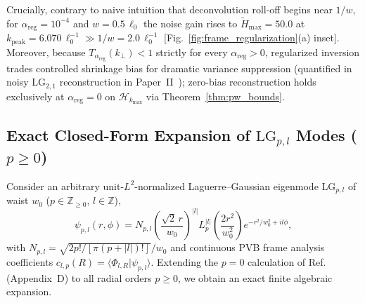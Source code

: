 \documentclass[aps,pra,onecolumn,notitlepage,11pt,tightenlines,nofootinbib,floatfix,longbibliography]{revtex4-2}
\theoremstyle{remark}
\newcommand{\braket}[2]{\langle #1 | #2 \rangle}
\newcommand{\abs}[1]{\lvert #1 \rvert}
\begin{document}
Crucially, contrary to naive intuition that deconvolution roll-off begins near $1/w$, for $\alpha_{\mathrm{reg}} = 10^{-4}$ and $w = 0.5\,\ell_0$ the noise gain rises to $\widetilde{H}_{\max} = 50.0$ at $k_{\mathrm{peak}} = 6.070\,\ell_0^{-1} \gg 1/w = 2.0\,\ell_0^{-1}$ [Fig.~\ref{fig:frame_regularization}(a) inset]. Moreover, because $T_{\alpha_{\mathrm{reg}}}(k_\perp) < 1$ strictly for every $\alpha_{\mathrm{reg}} > 0$, regularized inversion trades controlled shrinkage bias for dramatic variance suppression (quantified in noisy $\mathrm{LG}_{2,1}$ reconstruction in Paper~II~\cite{AyalaPaperII}); zero-bias reconstruction holds exclusively at $\alpha_{\mathrm{reg}} = 0$ on $\mathcal{H}_{k_{\max}}$ via Theorem~\ref{thm:pw_bounds}.

\subsection{Exact Closed-Form Expansion of \texorpdfstring{$\mathrm{LG}_{p,l}$}{LG\_\{p,l\}} Modes (\texorpdfstring{$p \ge 0$}{p >= 0})}
\label{subsec:lg_expansion}

Consider an arbitrary unit-$L^2$-normalized Laguerre--Gaussian eigenmode $\mathrm{LG}_{p,l}$ of waist $w_0$ ($p \in \mathbb{Z}_{\ge 0}$, $l \in \mathbb{Z}$),
\begin{equation}
\psi_{p,l}(r,\phi) = N_{p,l}\left(\frac{\sqrt{2}\,r}{w_0}\right)^{\abs{l}} L_p^{\abs{l}}\!\left(\frac{2r^2}{w_0^2}\right) e^{-r^2/w_0^2 + il\phi},
\label{eq:lg_def}
\end{equation}
with $N_{p,l} = \sqrt{2p!/[\pi(p+\abs{l})!]}/w_0$ and continuous PVB frame analysis coefficients $c_{l,p}(R) = \braket{\Phi_{l,R}}{\psi_{p,l}}$. Extending the $p = 0$ calculation of Ref.~\cite{Ferreira2026} (Appendix~D) to all radial orders $p \ge 0$, we obtain an exact finite algebraic expansion.
\end{document}
